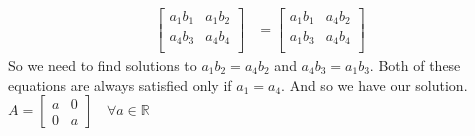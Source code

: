 \documentclass[letterpaper]{article}
\begin{document}
\begin{enumerate}
\begin{align*}
  \left[\begin{array}{cc}
    a_1b_1&a_1b_2\\
    a_4b_3&a_4b_4\\
  \end{array}\right]
  &=
  \left[\begin{array}{cc}
    a_1b_1&a_4b_2\\
    a_1b_3&a_4b_4\\
  \end{array}\right]
\end{align*}
So we need to find solutions to $a_1b_2=a_4b_2$ and $a_4b_3=a_1b_3$. Both of these equations are always satisfied only if $a_1=a_4$. And so we have our solution. $A=\left[\begin{array}{cc}a&0\\0&a\end{array}\right]\quad\forall a\in \mathbb{R}$
\end{enumerate}
\end{document}
